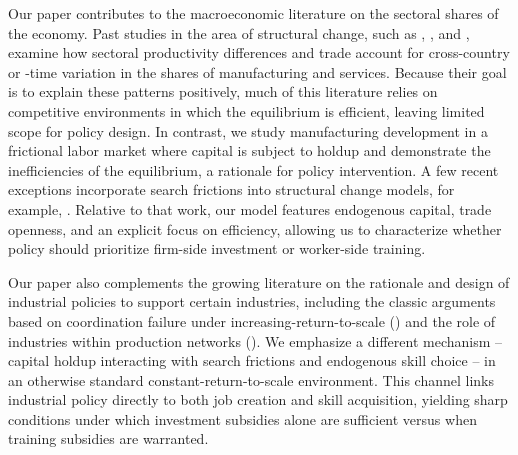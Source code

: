 \documentclass[12pt]{article} %
\theoremstyle{definition}
\begin{document}
Our paper contributes to the macroeconomic literature on the sectoral shares of the economy.  Past studies in the area of structural change, such as \cite{DuarteRestuccia2010}, \cite{uy2013structural}, and \cite{huneeus2024heterogeneous}, examine how sectoral productivity differences and trade account for cross-country or -time variation in the shares of manufacturing and services. Because their goal is to explain these patterns positively,  much of this literature relies on competitive environments in which the equilibrium is efficient, leaving limited scope for policy design.  In contrast, we study manufacturing development in a frictional labor market where capital is subject to holdup and demonstrate the  inefficiencies of the equilibrium, a rationale for policy intervention.  A few recent exceptions incorporate search frictions into structural change models, for example, \cite{feng2024unemployment}. Relative to that work, our model features endogenous capital, trade openness, and an explicit focus on efficiency, allowing us to characterize whether policy should prioritize firm-side investment or worker-side training. 


Our paper also complements the growing literature  on the rationale and design of industrial policies to support certain industries, including the classic arguments based on coordination failure under increasing-return-to-scale (\cite{matsuyama1991increasing}) and the role of  industries within production networks (\cite{liu2019industrial}). We emphasize a different mechanism -- capital holdup interacting with search frictions and endogenous skill choice -- in  an otherwise standard constant-return-to-scale environment.  This channel links industrial policy directly to both job creation and skill acquisition, yielding sharp conditions under which investment subsidies alone are sufficient versus when training subsidies are warranted. 
\end{document}
